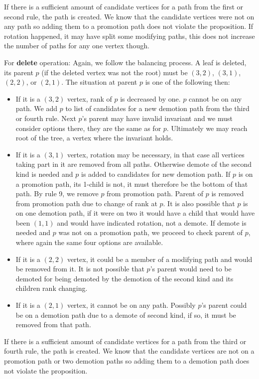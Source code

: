 \begin{myproof}
\begin{itemize}
\end{itemize}

If there is a sufficient amount of candidate vertices for a path from the first or second rule, the path is created. We know that the candidate vertices were not on any path so adding them to a promotion path does not violate the proposition. If rotation happened, it may have split some modifying paths, this does not increase the number of paths for any one vertex though.

For \textbf{delete} operation: Again, we follow the balancing process. A leaf is deleted, its parent $p$ (if the deleted vertex was not the root) must be $(3,2)$, $(3,1)$, $(2,2)$, or $(2,1)$. The situation at parent $p$ is one of the following then:

\begin{itemize}

\item If it is a $(3,2)$ vertex, rank of $p$ is decreased by one. 
$p$ cannot be on any path. 
We add $p$ to list of candidates for a new demotion path from the third or fourth rule. 
Next $p$'s parent may have invalid invariant and we must consider options there, they are the same as for $p$. 
Ultimately we may reach root of the tree, a vertex where the invariant holds.

\item If it is a $(3,1)$ vertex, rotation may be necessary, in that case all vertices taking part in it are removed from all paths.
Otherwise demote of the second kind is needed and $p$ is added to candidates for new demotion path.
If $p$ is on a promotion path, its 1-child is not, it must therefore be the bottom of that path. By rule 9, we remove $p$ from promotion path. Parent of $p$ is removed from promotion path due to change of rank at $p$.
It is also possible that $p$ is on one demotion path, if it were on two it would have a child that would have been $(1,1)$ and would have indicated rotation, not a demote.
If demote is needed and $p$ was not on a promotion path, we proceed to check parent of $p$, where again the same four options are available.

\item If it is a $(2,2)$ vertex, it could be a member of a modifying path and would be removed from it. It is not possible that $p$'s parent would need to be demoted for being demoted by the demotion of the second kind and its children rank changing.

\item If it is a $(2,1)$ vertex, it cannot be on any path. Possibly $p$'s parent could be on a demotion path due to a demote of second kind, if so, it must be removed from that path.

\end{itemize}

If there is a sufficient amount of candidate vertices for a path from the third or fourth rule, the path is created. We know that the candidate vertices are not on a promotion path or two demotion paths so adding them to a demotion path does not violate the proposition.
\end{myproof}

